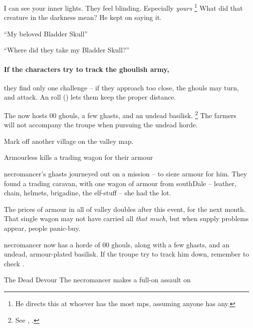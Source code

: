 \begin{speechtext}
  I can see your inner lights.
  They feel blinding.
  Especially \emph{yours}%
  \footnote{He directs this at whoever has the most \glspl{mp}, assuming anyone has any.}
  What did that creature in the darkness mean?
  He kept on saying it.

  ``My beloved Bladder Skull''

  ``Where did they take my Bladder Skull?''
\end{speechtext}

\paragraph{If the characters try to track the ghoulish army,}
they find only one challenge -- if they approach too close, the ghouls may turn, and attack.
An  roll (\tn[10]) lets them keep the proper distance.

The  now hosts 00 ghouls, a few ghasts, and an undead basilisk.%
\footnote{See , .}
The farmers will not accompany the troupe when pursuing the undead horde.

Mark off another \gls{village} on the \gls{valley} map.


{\squash Armourless}%
{ kills a trading wagon for their armour}%

\begin{exampletext}
  \Gls{necromancer}'s ghasts journeyed out on a mission -- to sieze armour for him.
  They found a trading caravan, with one wagon of armour from \gls{southDale} -- leather, chain, helmets, brigadine, the elf-stuff -- she had the lot.
\end{exampletext}

The prices of armour in all of \gls{valley} doubles after this event, for the next month.
That single wagon may not have carried all \emph{that much}, but when supply problems appear, people panic-buy.

\Gls{necromancer} now has a horde of 00 ghouls, along with a few ghasts, and an undead, armour-plated basilisk.
If the troupe try to track him down, remember to check .

{The Dead Devour}%
{The necromancer makes a full-on assault on }%

